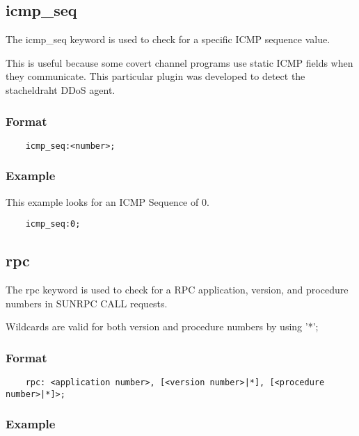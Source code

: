 \documentclass[english]{report}
\begin{document}
\subsection{icmp\_seq}

The icmp\_seq keyword is used to check for a specific ICMP sequence value.

This is useful because some covert channel programs use static ICMP fields when
they communicate.  This particular plugin was developed to detect the
stacheldraht DDoS agent.

\subsubsection{Format}

\begin{verbatim}
    icmp_seq:<number>;
\end{verbatim}

\subsubsection{Example}

This example looks for an ICMP Sequence of 0.

\begin{verbatim}
    icmp_seq:0;
\end{verbatim}

\subsection{rpc}

The rpc keyword is used to check for a RPC application, version, and procedure
numbers in SUNRPC CALL requests.

Wildcards are valid for both version and procedure numbers by using '*';

\subsubsection{Format}

\begin{verbatim}
    rpc: <application number>, [<version number>|*], [<procedure number>|*]>;
\end{verbatim}

\subsubsection{Example}
\end{document}
